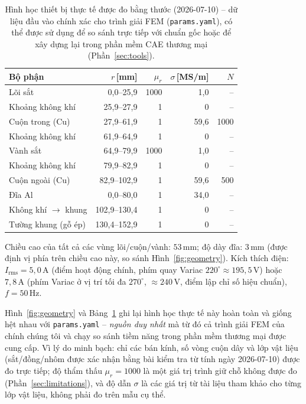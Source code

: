 \documentclass[a4paper, 10pt, conference]{ieeeconf}
\theoremstyle{remark}
\begin{document}
\begin{table}[t]
\centering\footnotesize
\caption{Hình học thiết bị thực tế được đo bằng thước (2026-07-10) -- dữ liệu đầu
vào chính xác cho trình giải FEM (\texttt{params.yaml}), có thể được sử dụng để
so sánh trực tiếp với chuẩn gốc hoặc để xây dựng lại trong phần mềm CAE thương mại
(Phần~\ref{sec:tools}).}
\label{tab:geometry}
\begin{tabular}{@{}lrrrr@{}}
\toprule
Bộ phận & $r$\,[mm] & $\mu_r$ & $\sigma$\,[MS/m] & $N$ \\
\midrule
Lõi sắt & 0{,}0--25{,}9 & 1000 & 1{,}0 & -- \\
Khoảng không khí & 25{,}9--27{,}9 & 1 & 0 & -- \\
Cuộn trong (Cu) & 27{,}9--61{,}9 & 1 & 59{,}6 & 1000 \\
Khoảng không khí & 61{,}9--64{,}9 & 1 & 0 & -- \\
Vành sắt & 64{,}9--79{,}9 & 1000 & 1{,}0 & -- \\
Khoảng không khí & 79{,}9--82{,}9 & 1 & 0 & -- \\
Cuộn ngoài (Cu) & 82{,}9--102{,}9 & 1 & 59{,}6 & 500 \\
Đĩa Al & 0{,}0--80{,}0 & 1 & 34{,}0 & -- \\
Không khí $\to$ khung & 102{,}9--130{,}4 & 1 & 0 & -- \\
Tường khung (gỗ ép) & 130{,}4--152{,}9 & 1 & 0 & -- \\
\bottomrule
\end{tabular}

\vspace{2pt}
{\footnotesize Chiều cao của tất cả các vùng lõi/cuộn/vành: $53\,\mathrm{mm}$;
độ dày đĩa: $3\,\mathrm{mm}$ (được định vị phía trên chiều cao này, so sánh
Hình~\ref{fig:geometry}). Kích thích điện: $I_{\mathrm{rms}}=5{,}0\,\mathrm A$
(điểm hoạt động chính, phím quay Variac $220^\circ\approx195{,}5\,\mathrm V$)
hoặc $7{,}8\,\mathrm A$ (phím Variac ở vị trí tối đa $270^\circ$, $\approx240\,\mathrm V$,
điểm lập chỉ số hiệu chuẩn), $f=50\,\mathrm{Hz}$.}
\end{table}

Hình~\ref{fig:geometry} và Bảng~\ref{tab:geometry} ghi lại hình học thực tế này
hoàn toàn và giống hệt nhau với \texttt{params.yaml} -- \emph{nguồn duy nhất}
mà từ đó cả trình giải FEM của chính chúng tôi và chạy so sánh tiềm năng trong
phần mềm thương mại được cung cấp. Vì lý do minh bạch: chỉ các bán kính, số vòng
cuộn dây và lớp vật liệu (sắt/đồng/nhôm được xác nhận bằng bài kiểm tra từ tính
ngày 2026-07-10) được đo trực tiếp; độ thẩm thấu $\mu_r=1000$ là một giá trị
trình giữ chỗ không được đo (Phần~\ref{sec:limitations}), và độ dẫn $\sigma$ là
các giá trị từ tài liệu tham khảo cho từng lớp vật liệu, không phải đo trên mẫu
cụ thể.
\end{document}
